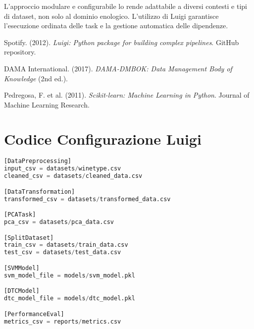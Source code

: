 \documentclass[a4paper, 12pt]{article}
\begin{document}
L'approccio modulare e configurabile lo rende adattabile a diversi contesti e tipi di dataset, non solo al dominio enologico.
L'utilizzo di Luigi garantisce l'esecuzione ordinata delle task e la gestione automatica delle dipendenze.

\begin{thebibliography}{9}
Spotify. (2012).
\textit{Luigi: Python package for building complex pipelines}.
GitHub repository.

DAMA International. (2017).
\textit{DAMA-DMBOK: Data Management Body of Knowledge} (2nd ed.).

Pedregosa, F. et al. (2011).
\textit{Scikit-learn: Machine Learning in Python}.
Journal of Machine Learning Research.
\end{thebibliography}

\appendix
\section{Codice Configurazione Luigi}
\begin{lstlisting}[language=python, caption=Esempio file luigi.cfg]
[DataPreprocessing]
input_csv = datasets/winetype.csv
cleaned_csv = datasets/cleaned_data.csv

[DataTransformation]
transformed_csv = datasets/transformed_data.csv

[PCATask]
pca_csv = datasets/pca_data.csv

[SplitDataset]
train_csv = datasets/train_data.csv
test_csv = datasets/test_data.csv

[SVMModel]
svm_model_file = models/svm_model.pkl

[DTCModel]
dtc_model_file = models/dtc_model.pkl

[PerformanceEval]
metrics_csv = reports/metrics.csv
\end{lstlisting}
\end{document}
